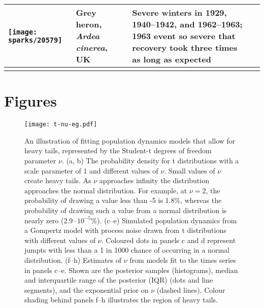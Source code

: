 \documentclass[11pt]{article}
\begin{document}
\begin{small}
\begin{longtable}{>{\RaggedRight}m{2.0cm}>{\RaggedRight}p{3.0cm}>{\RaggedRight}p{7.0cm}>{\RaggedRight}p{2.0cm}}
\texttt{[image: sparks/20579]} &
Grey heron,
\textit{Ardea cinerea},
UK &
Severe winters in 1929, 1940--1942, and 1962--1963; 1963 event so severe that recovery took three times as long as expected &
\citep{stafford1971} \\





\bottomrule
\label{tab:sparks}
\end{longtable}
\end{small}


\clearpage

\section{Figures}

\begin{figure}[htbp]
\begin{center}
\texttt{[image: t-nu-eg.pdf]}
\caption{An illustration of fitting population dynamics models that allow for heavy tails, represented by the Student-t degrees of freedom parameter $\nu$.
  (a, b) The probability density for t distributions with a scale parameter of 1 and different values of $\nu$.
  Small values of $\nu$ create heavy tails.
  As $\nu$ approaches infinity the distribution approaches the normal distribution.
  For example, at $\nu = 2$, the probability of drawing a value less than -5 is 1.8\%, whereas the probability of drawing such a value from a normal distribution is nearly zero ($2.9\cdot10^{-5}$\%).
  (c--e) Simulated population dynamics from a Gompertz model with process noise drawn from t distributions with different values of $\nu$.  
  Coloured dots in panels c and d represent jumpts with less than a 1 in 1000 chance of occurring in a normal distribution.
  (f--h) Estimates of $\nu$ from models fit to the times series in panels c--e.
  Shown are the posterior samples (histograms), median and interquartile range of the posterior (IQR) (dots and line segments), and the exponential prior on $\nu$ (dashed lines).
  Colour shading behind panels f--h illustrates the region of heavy tails.}
\label{fig:didactic}
\end{center}
\end{figure}
\end{document}
